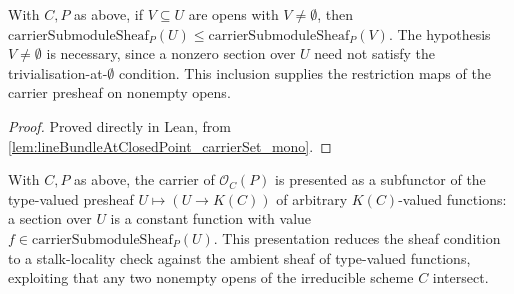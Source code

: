 \begin{lemma}
  \label{lem:lineBundleAtClosedPoint_carrierSubmoduleSheaf_le}
  With \(C, P\) as above, if \(V \subseteq U\) are opens with
  \(V \ne \emptyset\), then
  \(\mathrm{carrierSubmoduleSheaf}_P(U) \le \mathrm{carrierSubmoduleSheaf}_P(V)\).
  The hypothesis \(V \ne \emptyset\) is necessary, since a nonzero section
  over \(U\) need not satisfy the trivialisation-at-\(\emptyset\) condition.
  This inclusion supplies the restriction maps of the carrier presheaf on
  nonempty opens.
\end{lemma}

\begin{proof}
  Proved directly in Lean, from \cref{lem:lineBundleAtClosedPoint_carrierSet_mono}.
\end{proof}

\begin{definition}
  \label{def:lineBundleAtClosedPoint_carrierTypeSubfunctor}
  With \(C, P\) as above, the carrier of \(\mathcal O_C(P)\) is presented as a
  subfunctor of the type-valued presheaf \(U \mapsto (U \to K(C))\) of
  arbitrary \(K(C)\)-valued functions: a section over \(U\) is a constant
  function with value \(f \in \mathrm{carrierSubmoduleSheaf}_P(U)\). This
  presentation reduces the sheaf condition to a stalk-locality check against
  the ambient sheaf of type-valued functions, exploiting that any two nonempty
  opens of the irreducible scheme \(C\) intersect.
\end{definition}

